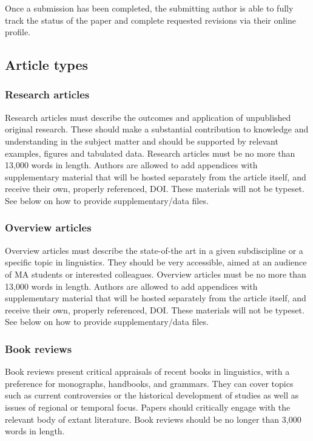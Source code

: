 \documentclass[charis,linguex,biblatex]{glossa}
\begin{document}
Once a submission has been completed, the submitting author is able to fully track the status of the paper and complete requested revisions via their online profile.

\subsection{Article types}

\subsubsection{Research articles}

Research articles must describe the outcomes and application of unpublished original research. These should make a substantial contribution to knowledge and understanding in the subject matter and should be supported by relevant examples, figures and tabulated data. Research articles must be no more than 13,000 words in length. Authors are allowed to add appendices with supplementary material that will be hosted separately from the article itself, and receive their own, properly referenced, DOI. These materials will not be typeset. See below on how to provide supplementary/data files.

\subsubsection{Overview articles}

Overview articles must describe the state-of-the art in a given subdiscipline or a specific topic in linguistics. They should be very accessible, aimed at an audience of MA students or interested colleagues. Overview articles must be no more than 13,000 words in length. Authors are allowed to add appendices with supplementary material that will be hosted separately from the article itself, and receive their own, properly referenced, DOI. These materials will not be typeset.  See below on how to provide supplementary/data files.

\subsubsection{Book reviews}

Book reviews present critical appraisals of recent books in linguistics, with a preference for monographs, handbooks, and grammars. They can cover topics such as current controversies or the historical development of studies as well as issues of regional or temporal focus. Papers should critically engage with the relevant body of extant literature. Book reviews should be no longer than 3,000 words in length.
\end{document}
